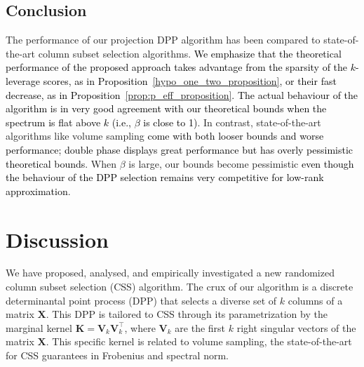 \documentclass[twoside,11pt]{book}
\newcommand{\rev}[1]{\textcolor{black}{#1}}
\numberwithin{theorem}{chapter}
\numberwithin{definition}{chapter}
\numberwithin{proposition}{chapter}
\numberwithin{corollary}{chapter}
\numberwithin{example}{chapter}
\numberwithin{lemma}{chapter}
\numberwithin{assumption}{chapter}
\numberwithin{equation}{chapter}
\numberwithin{figure}{chapter}
\DeclareMathOperator{\Tran}{\intercal}
\begin{document}
\subsection{Conclusion}
The performance of our projection DPP algorithm has been compared to state-of-the-art column subset selection algorithms. \rev{We emphasize that the theoretical performance of the proposed approach takes advantage from the sparsity of the $k$-leverage scores, as in Proposition~\ref{hypo_one_two_proposition}, or their fast decrease, as in Proposition~\ref{prop:p_eff_proposition}. The actual behaviour of the algorithm is in very good agreement with our theoretical bounds when the spectrum is flat above $k$ (i.e., $\beta$ is close to 1)}. In contrast, state-of-the-art algorithms like volume sampling \rev{come with both looser bounds and worse performance; double phase displays great performance but has overly pessimistic theoretical bounds}. When $\beta$ is large, our bounds become pessimistic \rev{even though the behaviour of the DPP selection remains very competitive for low-rank approximation}.




\section{Discussion} 


We have proposed, analysed, and empirically investigated a new randomized column subset selection (CSS) algorithm. The crux of our algorithm is a discrete determinantal point process (DPP) that selects a diverse set of $k$ columns of a matrix $\bm{X}$. This DPP is tailored to CSS through its parametrization by the marginal kernel $\bm{K} = \bm{V}_{k}\bm{V}_{k}^{\Tran}$, where $\bm{V}_{k}$ are the first $k$ right singular vectors of the matrix $\bm{X}$. This specific kernel is related to volume sampling, the state-of-the-art for CSS guarantees in Frobenius and spectral norm.
\end{document}
